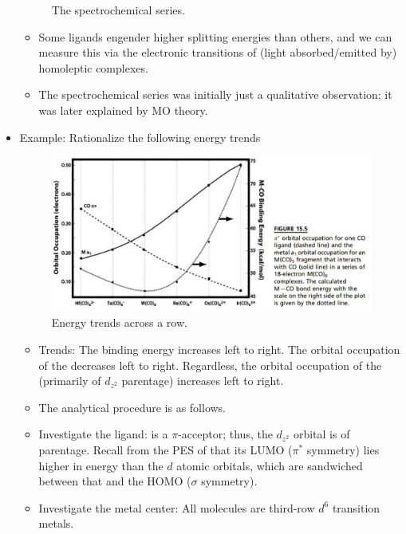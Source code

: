 \documentclass[../notes.tex]{subfiles}
\begin{document}
\begin{itemize}
\begin{figure}[h!]
        \caption{The spectrochemical series.}
        \label{fig:spectrochemicalSeries}
    \end{figure}
    \begin{itemize}
        \item Some ligands engender higher splitting energies than others, and we can measure this via the electronic transitions of (light absorbed/emitted by) homoleptic complexes.
        \item The spectrochemical series was initially just a qualitative observation; it was later explained by MO theory.
    \end{itemize}
    \item Example: Rationalize the following energy trends
    \begin{figure}[H]
        \centering
        \includegraphics[width=0.6\linewidth]{../ExtFiles/rowEnergyTrends.png}
        \caption{Energy trends across a row.}
        \label{fig:rowEnergyTrends}
    \end{figure}
    \begin{itemize}
        \item Trends: The  binding energy increases left to right. The orbital occupation of the  decreases left to right. Regardless, the orbital occupation of the  (primarily of $d_{z^2}$ parentage) increases left to right.
        \item The analytical procedure is as follows.
        \item Investigate the ligand:  is a $\pi$-acceptor; thus, the $d_{z^2}$ orbital is of  parentage. Recall from the PES of  that its LUMO ($\pi^*$ symmetry) lies higher in energy than the $d$ atomic orbitals, which are sandwiched between that and the HOMO ($\sigma$ symmetry).
        \item Investigate the metal center: All molecules are third-row $d^6$ transition metals.

\end{itemize}
\end{itemize}
\end{document}
